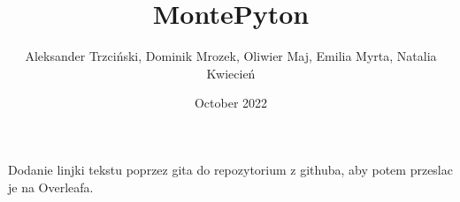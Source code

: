 \documentclass{article}
\title{MontePyton}
\author{Aleksander Trzciński, Dominik Mrozek, Oliwier Maj, Emilia Myrta, Natalia Kwiecień}
\date{October 2022}
\begin{document}
\maketitle


\vspace{0.1cm}

\vspace{0.1cm}

\vspace{0.1cm}

\vspace{0.1cm}


Dodanie linjki tekstu poprzez gita do repozytorium z githuba, aby potem przeslac je na Overleafa.
\end{document}
